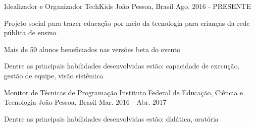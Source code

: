 \begin{cventries}
%

  \cventry
    {Idealizador e Organizador}
    {TechKids}
    {João Pessoa, Brasil}
    {Ago. 2016 - PRESENTE}
    {
      \begin{cvitems}
        \item {Projeto social para trazer educação por meio da tecnologia para crianças da rede pública de ensino}
        \item {Mais de 50 alunos beneficiados nas versões beta do evento}
        \item {Dentre as principais habilidades desenvolvidas estão: capacidade de execução, gestão de equipe, visão sistêmica}
      \end{cvitems}
    }

  \cventry
    {Monitor de Técnicas de Programação} %
    {Instituto Federal de Educação, Ciência e Tecnologia} %
    {João Pessoa, Brasil} %
    {Mar. 2016 - Abr. 2017} %
    {
      \begin{cvitems} %
        \item {Dentre as principais habilidades desenvolvidas estão: didática, oratória}
      \end{cvitems}
    }


\end{cventries}
